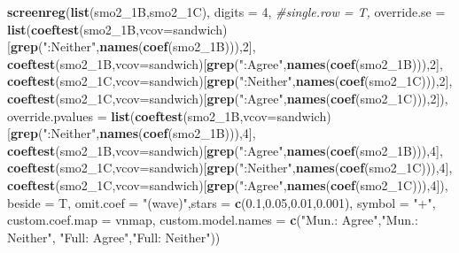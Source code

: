 \documentclass[
]{article}
\newenvironment{Shaded}{\begin{snugshade}}{\end{snugshade}}
\newcommand{\CommentTok}[1]{\textcolor[rgb]{0.56,0.35,0.01}{\textit{#1}}}
\newcommand{\DataTypeTok}[1]{\textcolor[rgb]{0.13,0.29,0.53}{#1}}
\newcommand{\DecValTok}[1]{\textcolor[rgb]{0.00,0.00,0.81}{#1}}
\newcommand{\FloatTok}[1]{\textcolor[rgb]{0.00,0.00,0.81}{#1}}
\newcommand{\KeywordTok}[1]{\textcolor[rgb]{0.13,0.29,0.53}{\textbf{#1}}}
\newcommand{\NormalTok}[1]{#1}
\newcommand{\StringTok}[1]{\textcolor[rgb]{0.31,0.60,0.02}{#1}}
\begin{document}
\begin{Shaded}
\begin{Highlighting}[]
\KeywordTok{screenreg}\NormalTok{(}\KeywordTok{list}\NormalTok{(smo2_1B,smo2_1C), }\DataTypeTok{digits =} \DecValTok{4}\NormalTok{, }\CommentTok{#single.row = T,}
          \DataTypeTok{override.se =} \KeywordTok{list}\NormalTok{(}\KeywordTok{coeftest}\NormalTok{(smo2_1B,}\DataTypeTok{vcov=}\NormalTok{sandwich)[}\KeywordTok{grep}\NormalTok{(}\StringTok{":Neither"}\NormalTok{,}\KeywordTok{names}\NormalTok{(}\KeywordTok{coef}\NormalTok{(smo2_1B))),}\DecValTok{2}\NormalTok{],}
                             \KeywordTok{coeftest}\NormalTok{(smo2_1B,}\DataTypeTok{vcov=}\NormalTok{sandwich)[}\KeywordTok{grep}\NormalTok{(}\StringTok{":Agree"}\NormalTok{,}\KeywordTok{names}\NormalTok{(}\KeywordTok{coef}\NormalTok{(smo2_1B))),}\DecValTok{2}\NormalTok{],}
                             \KeywordTok{coeftest}\NormalTok{(smo2_1C,}\DataTypeTok{vcov=}\NormalTok{sandwich)[}\KeywordTok{grep}\NormalTok{(}\StringTok{":Neither"}\NormalTok{,}\KeywordTok{names}\NormalTok{(}\KeywordTok{coef}\NormalTok{(smo2_1C))),}\DecValTok{2}\NormalTok{],}
                             \KeywordTok{coeftest}\NormalTok{(smo2_1C,}\DataTypeTok{vcov=}\NormalTok{sandwich)[}\KeywordTok{grep}\NormalTok{(}\StringTok{":Agree"}\NormalTok{,}\KeywordTok{names}\NormalTok{(}\KeywordTok{coef}\NormalTok{(smo2_1C))),}\DecValTok{2}\NormalTok{]),}
          \DataTypeTok{override.pvalues =} \KeywordTok{list}\NormalTok{(}\KeywordTok{coeftest}\NormalTok{(smo2_1B,}\DataTypeTok{vcov=}\NormalTok{sandwich)[}\KeywordTok{grep}\NormalTok{(}\StringTok{":Neither"}\NormalTok{,}\KeywordTok{names}\NormalTok{(}\KeywordTok{coef}\NormalTok{(smo2_1B))),}\DecValTok{4}\NormalTok{],}
                                  \KeywordTok{coeftest}\NormalTok{(smo2_1B,}\DataTypeTok{vcov=}\NormalTok{sandwich)[}\KeywordTok{grep}\NormalTok{(}\StringTok{":Agree"}\NormalTok{,}\KeywordTok{names}\NormalTok{(}\KeywordTok{coef}\NormalTok{(smo2_1B))),}\DecValTok{4}\NormalTok{],}
                                  \KeywordTok{coeftest}\NormalTok{(smo2_1C,}\DataTypeTok{vcov=}\NormalTok{sandwich)[}\KeywordTok{grep}\NormalTok{(}\StringTok{":Neither"}\NormalTok{,}\KeywordTok{names}\NormalTok{(}\KeywordTok{coef}\NormalTok{(smo2_1C))),}\DecValTok{4}\NormalTok{],}
                                  \KeywordTok{coeftest}\NormalTok{(smo2_1C,}\DataTypeTok{vcov=}\NormalTok{sandwich)[}\KeywordTok{grep}\NormalTok{(}\StringTok{":Agree"}\NormalTok{,}\KeywordTok{names}\NormalTok{(}\KeywordTok{coef}\NormalTok{(smo2_1C))),}\DecValTok{4}\NormalTok{]),}
          \DataTypeTok{beside =}\NormalTok{ T,}
          \DataTypeTok{omit.coef =} \StringTok{"(wave)"}\NormalTok{,}\DataTypeTok{stars =} \KeywordTok{c}\NormalTok{(}\FloatTok{0.1}\NormalTok{,}\FloatTok{0.05}\NormalTok{,}\FloatTok{0.01}\NormalTok{,}\FloatTok{0.001}\NormalTok{), }\DataTypeTok{symbol =} \StringTok{"+"}\NormalTok{,}
          \DataTypeTok{custom.coef.map =}\NormalTok{ vnmap,}
          \DataTypeTok{custom.model.names =} \KeywordTok{c}\NormalTok{(}\StringTok{"Mun.: Agree"}\NormalTok{,}\StringTok{"Mun.: Neither"}\NormalTok{,}
                                 \StringTok{"Full: Agree"}\NormalTok{,}\StringTok{"Full: Neither"}\NormalTok{))}
\end{Highlighting}
\end{Shaded}
\end{document}

